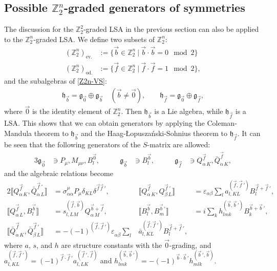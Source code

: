 \documentclass[a4paper,12pt]{article}
\def\nn{\nonumber}
\def\Z{\mathbb{Z}}
\def\ua{\alpha}
\def\da{\dot{\alpha}}
\def\ub{\beta}
\def\db{\dot{\beta}}
\def\g{\mathfrak{g}}
\def\h{\mathfrak{h}}
\def\HLS{Haag-\L opusza\'nski-Sohnius }
\def\CM{Coleman-Mandula }
\def\ev{\text{ev.}}
\def\od{\text{od.}}
\theoremstyle{plain}
\theoremstyle{definition}
\begin{document}
\subsection{Possible $\Z_2^n$-graded generators of symmetries}
The discussion for the $\Z_2^2$-graded LSA in the previous section can also be applied to the $\Z_2^n$-graded LSA. We define two subsets of $\Z_2^n$:
\begin{align}
 (\Z_2^n)_{\ev}&:=\{\vec{b}\in \Z_2^n\  |\ \vec{b}\cdot \vec{b}=0 \mod 2\}\nn\\
 (\Z_2^n)_{\od}&:=\{\vec{f}\in \Z_2^n\  |\ \vec{f}\cdot \vec{f}=1 \mod 2\}
,
\end{align}
and the subalgebras of \eqref{Z2n-VS}:
\begin{align}
 \h_{\vec{b}}=\g_{\vec{0}}\oplus \g_{\vec{b}}\quad (\vec{b}\ne \vec{0})
,\qquad
 \h_{\vec{f}}=\g_{\vec{0}}\oplus \g_{\vec{f}}
,
\end{align}
where $\vec{0}$ is the identity element of $\Z_2^n$. 
Then $\h_{\vec{b}}$ is a Lie algebra, while $\h_{\vec{f}}$ is a LSA. This shows that we can obtain generators by applying the \CM theorem to $\h_{\vec{b}}$ and the \HLS theorem to $\h_{\vec{f}}$.  It can be seen that the following generators of the $S$-matrix are allowed:
\begin{alignat}{3}
 \g_{\vec{0}}&\ni P_\mu, M_{\mu\nu}, B^{\vec{0}}_l
,\qquad&
 \g_{\vec{b}}&\ni B^{\vec{b}}_l
,\qquad&
 \g_{\vec{f}}&\ni Q_{\ua\,K}^{\vec{f}}, \bar Q_{\da\,K}^{\vec{f}}
,
\end{alignat}
and the algebraic relations become
\begin{alignat}{2}
\llbracket Q_{\ua\,K}^{\vec{f}}, \bar Q_{\da\,L}^{\vec{f}\,'} \rrbracket &=\sigma_{\ua\da}^{\mu} P_\mu\delta_{KL}\delta^{\vec{f}\vec{f}\,'}
, \qquad&
\llbracket Q_{\ua\,K}^{\vec{f}}, Q_{\ub\,L}^{\vec{f}\,'} \rrbracket
&=\varepsilon_{\ua\ub} \sum_l a^{(\vec{f},\vec{f}\,')}_{l,KL} B^{\vec{f}+\vec{f}\,'}_l
,\nn\\
\llbracket Q^{\vec{f}}_{\ua\,L},B_l^{\vec{b}} \rrbracket 
&=s^{(\vec{f},\vec{b})}_{l,LM}Q^{\vec{b}+\vec{f}}_{\ua\,M}
, &
\llbracket B_l^{\vec{b}},B_m^{\vec{b}\,'} \rrbracket 
&=i\sum_k h^{(\vec{b},\vec{b}\,')}_{lmk} B_k^{\vec{b}+\vec{b}\,'}
,\nn\\
\llbracket \bar Q_{\da\,K}^{\vec{f}}, \bar Q_{\db\,L}^{\vec{f}\,'} \rrbracket
&=-(-1)^{(\vec{f},\vec{f}\,')}\varepsilon_{\da\db} \sum_l &\bar a^{(\vec{f},\vec{f}\,')}_{l,KL} B^{\vec{f}+\vec{f}\,'}_l
,
\label{Z2n-SUSY}
\end{alignat}
where $a,\,s$, and $h$ are structure constants with the $\vec{0}$-grading, and $a^{(\vec{f},\vec{f}\,')}_{l,KL}=(-1)^{\vec{f} \cdot \vec{f}\,' }a^{(\vec{f}\,',\vec{f})}_{l,LK}$ and $h^{(\vec{b},\vec{b}\,')}_{lmk}=-(-1)^{\vec{b}\cdot\vec{b}\,'}h^{(\vec{b}\,',\vec{b})}_{mlk}$.
\end{document}
